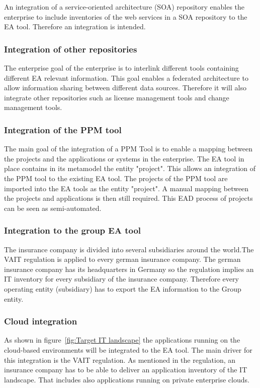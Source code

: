 An integration of a service-oriented architecture (SOA) repository enables the enterprise to include inventories of the web services in a SOA repository to the EA tool. Therefore an integration is intended.

\subsubsection{Integration of other repositories}
The enterprise goal of the enterprise is to interlink different tools containing different EA relevant information. This goal enables a federated architecture to allow information sharing between different data sources. Therefore it will also integrate other repositories such as license management tools and change management tools.

\subsubsection{Integration of the PPM tool}
The main goal of the integration of a PPM Tool is to enable a mapping between the projects and the applications or systems in the enterprise. The EA tool in place contains in its metamodel the entity "project". This allows an integration of the PPM tool to the existing EA tool. The projects of the PPM tool are imported into the EA tools as the entity "project". A manual mapping between the projects and applications is then still required. This EAD process of projects can be seen as semi-automated.

\subsubsection{Integration to the group EA tool}

The insurance company is divided into several subsidiaries around the world.The VAIT regulation is applied to every german insurance company. The german insurance company has its headquarters in Germany so the regulation implies an IT inventory for every subsidiary of the insurance company. Therefore every operating entity (subsidiary) has to export the EA information to the Group entity.

\subsubsection{Cloud integration}

As shown in figure~\ref{fig:Target IT landscape} the applications running on the cloud-based environments will be integrated to the EA tool. The main driver for this integration is the VAIT regulation. As mentioned in the regulation, an insurance company has to be able to deliver an application inventory of the IT landscape. That includes also applications running on private enterprise clouds. 

